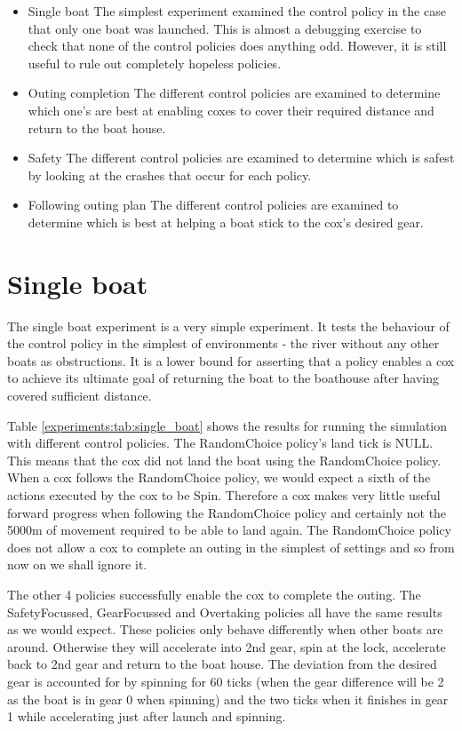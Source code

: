   \begin{itemize}
    \item{Single boat}
    The simplest experiment examined the control policy in the case
    that only one boat was launched. This is almost a debugging
    exercise to check that none of the control policies does anything
    odd. However, it is still useful to rule out completely hopeless policies.
  
    \item{Outing completion}
    The different control policies are examined to determine which
    one's are best at enabling coxes to cover their required distance
    and return to the boat house.
    
    \item{Safety}
    The different control policies are examined to determine which is
    safest by looking at the crashes that occur for each policy.

    \item{Following outing plan}
    The different control policies are examined to determine which is
    best at helping a boat stick to the cox's desired gear.
  \end{itemize}

\section{Single boat}
  The single boat experiment is a very simple experiment. It tests the behaviour of the control policy in the simplest of environments - the river without any other boats as obstructions. It is a lower bound for asserting that a policy enables a cox to achieve its ultimate goal of returning the boat to the boathouse after having covered sufficient distance.
  
  Table \ref{experiments:tab:single_boat} shows the results for running the simulation with different control policies. The RandomChoice policy's land tick is NULL. This means that the cox did not land the boat using the RandomChoice policy. When a cox follows the RandomChoice policy, we would expect a sixth of the actions executed by the cox to be Spin. Therefore a cox makes very little useful forward progress when following the RandomChoice policy and certainly not the 5000m of movement required to be able to land again. The RandomChoice policy does not allow a cox to complete an outing in the simplest of settings and so from now on we shall ignore it.
  
  The other 4 policies successfully enable the cox to complete the outing. The SafetyFocussed, GearFocussed and Overtaking policies all have the same results as we would expect. These policies only behave differently when other boats are around. Otherwise they will accelerate into 2nd gear, spin at the lock, accelerate back to 2nd gear and return to the boat house. The deviation from the desired gear is accounted for by spinning for 60 ticks (when the gear difference will be 2 as the boat is in gear 0 when spinning) and the two ticks when it finishes in gear 1 while accelerating just after launch and spinning.
  
